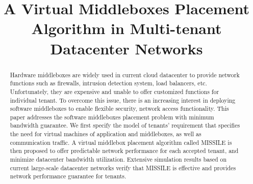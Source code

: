 \documentclass[10pt, conference, letterpaper]{IEEEtran}
\begin{document}
%
\title{A Virtual Middleboxes Placement Algorithm in Multi-tenant Datacenter Networks}

\author{
\and
{}
\and
{}
}


\maketitle


\begin{abstract}
Hardware middleboxes are widely used in current cloud datacenter to provide network functions such as firewalls, intrusion detection system, load balancers, etc. Unfortunately, they are expensive and unable to offer customized functions for individual tenant. To overcome this issue, there is an increasing interest in deploying software middleboxes to enable flexible security, network access functionality. This paper addresses the software middleboxes placement problem with minimum bandwidth guarantee. We first specify the model of tenants' requirement that specifies the need for virtual machines of application and middleboxes, as well as communication traffic. A virtual middlebox placement algorithm called MISSILE is then proposed to offer predictable network performance for each accepted tenant, and minimize datacenter bandwidth utilization. Extensive simulation results based on current large-scale datacenter networks verify that MISSILE is effective and provides network performance guarantee for tenants. 
\end{abstract}

\IEEEpeerreviewmaketitle
\end{document}
